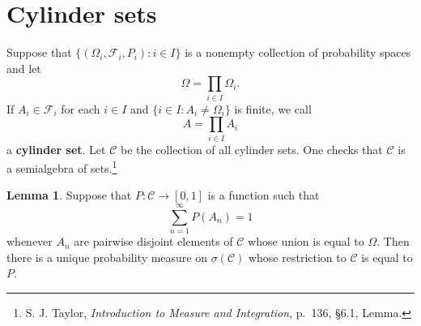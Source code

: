 \documentclass{article}
\theoremstyle{definition}
\newtheorem{lemma}[theorem]{Lemma}
\theoremstyle{definition}
\begin{document}
\section{Cylinder sets}
Suppose that $\{(\Omega_i,\mathscr{F}_i,P_i): i \in I\}$ is a nonempty collection of probability spaces and let
\[
\Omega = \prod_{i \in I} \Omega_i.
\]
If $A_i \in \mathscr{F}_i$ for each $i \in I$ and $\{i \in I: A_i \neq \Omega_i\}$ is finite,
we call
\[
A = \prod_{i \in I} A_i
\]
a \textbf{cylinder set}. Let $\mathscr{C}$ be the collection of all cylinder sets. 
One checks that $\mathscr{C}$ is a semialgebra of sets.\footnote{S. J. Taylor, {\em Introduction to Measure and Integration},
p.~136, \S 6.1, Lemma.}



\begin{lemma}
Suppose that $P:\mathscr{C} \to [0,1]$ is a function such that 
\[
\sum_{n=1}^\infty P(A_n)=1
\]
whenever $A_n$ are pairwise disjoint elements of $\mathscr{C}$ whose union is equal to $\Omega$. Then there is a unique probability measure
on $\sigma(\mathscr{C})$ whose restriction to $\mathscr{C}$ is equal to $P$. 
\label{cylinderextension}
\end{lemma}
\end{document}
